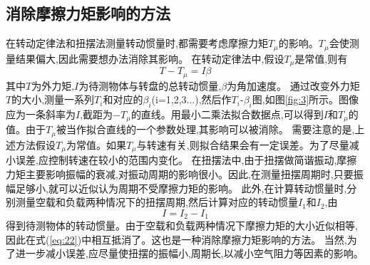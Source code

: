\documentclass[UTF8]{ctexart}
\begin{document}
\subsection{消除摩擦力矩影响的方法}
在转动定律法和扭摆法测量转动惯量时,都需要考虑摩擦力矩$T_\mu$的影响。$T_\mu$会使测量结果偏大,因此需要想办法消除其影响。
在转动定律法中,假设$T_\mu$是常值,则有
\begin{equation}
T-T_\mu=I\beta \label{eq:21}
\end{equation}
其中$T$为外力矩,$I$为待测物体与转盘的总转动惯量,$\beta$为角加速度。
通过改变外力矩$T$的大小,测量一系列$T_i$和对应的$\beta_i$(i=1,2,3...),然后作$T_i$-$\beta_i$图,如图\ref{fig:3}所示。图像应为一条斜率为$I$,截距为$-T_\mu$的直线。用最小二乘法拟合数据点,可以得到$I$和$T_\mu$的值。由于$T_\mu$被当作拟合直线的一个参数处理,其影响可以被消除。
需要注意的是,上述方法假设$T_\mu$为常值。如果$T_\mu$与转速有关,则拟合结果会有一定误差。为了尽量减小误差,应控制转速在较小的范围内变化。
在扭摆法中,由于扭摆做简谐振动,摩擦力矩主要影响振幅的衰减,对振动周期的影响很小。因此,在测量扭摆周期时,只要振幅足够小,就可以近似认为周期不受摩擦力矩的影响。
此外,在计算转动惯量时,分别测量空载和负载两种情况下的扭摆周期,然后计算对应的转动惯量$I_1$和$I_2$,由
\begin{equation}
I=I_2-I_1 \label{eq:22}
\end{equation}
得到待测物体的转动惯量。由于空载和负载两种情况下摩擦力矩的大小近似相等,因此在式(\ref{eq:22})中相互抵消了。这也是一种消除摩擦力矩影响的方法。
当然,为了进一步减小误差,应尽量使扭摆的振幅小,周期长,以减小空气阻力等因素的影响。
\end{document}
